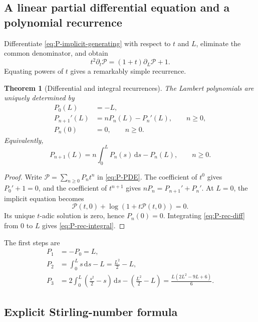 \documentclass[11pt]{article}
\theoremstyle{pltheorem}
\newtheorem{theorem}{Theorem}[section]
\newcommand{\dd}{\,\mathrm d}
\begin{document}
\subsection{A linear partial differential equation and a polynomial recurrence}

Differentiate \cref{eq:P-implicit-generating} with respect to \(t\) and \(L\), eliminate the common denominator, and obtain
\begin{equation}\label{eq:P-PDE}
 \boxed{\quad
 t^2\partial_t\mathcal P=(1+t)\partial_L\mathcal P+1.
 \quad}
\end{equation}
Equating powers of \(t\) gives a remarkably simple recurrence.

\begin{theorem}[Differential and integral recurrences]\label{thm:P-recurrence}
The Lambert polynomials are uniquely determined by
\begin{align}
 P_0(L)&=-L,\label{eq:P-rec-P0}\\
 P_{n+1}'(L)&=nP_n(L)-P_n'(L),\qquad n\ge0,
 \label{eq:P-rec-diff}\\
 P_n(0)&=0,\qquad n\ge0.
 \label{eq:P-zero}
\end{align}
Equivalently,
\begin{equation}\label{eq:P-rec-integral}
 \boxed{\quad
 P_{n+1}(L)=n\int_0^L P_n(s)\dd s-P_n(L),
 \qquad n\ge0.
 \quad}
\end{equation}
\end{theorem}

\begin{proof}
Write \(\mathcal P=\sum_{n\ge0}P_nt^n\) in \cref{eq:P-PDE}.  The coefficient of \(t^0\) gives \(P_0'+1=0\), and the coefficient of \(t^{n+1}\) gives
\(nP_n=P_{n+1}'+P_n'\).  At \(L=0\), the implicit equation becomes
\[
 \mathcal P(t,0)+\log(1+t\mathcal P(t,0))=0.
\]
Its unique \(t\)-adic solution is zero, hence \(P_n(0)=0\).  Integrating \cref{eq:P-rec-diff} from \(0\) to \(L\) gives \cref{eq:P-rec-integral}.
\end{proof}

The first steps are
\begin{align*}
 P_1&=-P_0=L,\\
 P_2&=\int_0^L s\dd s-L=\frac{L^2}{2}-L,\\
 P_3&=2\int_0^L\left(\frac{s^2}{2}-s\right)\dd s
 -\left(\frac{L^2}{2}-L\right)
 =\frac{L(2L^2-9L+6)}6.
\end{align*}

\subsection{Explicit Stirling-number formula}
\end{document}
